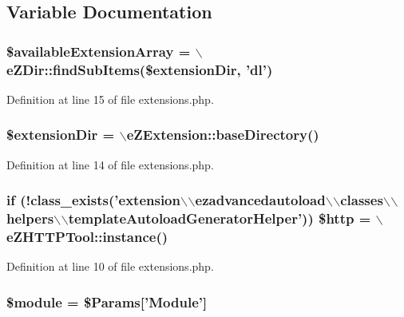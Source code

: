 \subsection{Variable Documentation}
\hypertarget{extensions_8php_a6fef3e6ef57dbe6a39892b6de0cc7f5f}{
\subsubsection[{\$available\-Extension\-Array}]{\setlength{\rightskip}{0pt plus 5cm}\$available\-Extension\-Array = $\backslash$e\-Z\-Dir\-::find\-Sub\-Items(\$extension\-Dir, 'dl')}}\label{extensions_8php_a6fef3e6ef57dbe6a39892b6de0cc7f5f}


Definition at line 15 of file extensions.\-php.

\hypertarget{extensions_8php_a511fe73f345235dca8dfab597f398521}{
\subsubsection[{\$extension\-Dir}]{\setlength{\rightskip}{0pt plus 5cm}\$extension\-Dir = $\backslash$e\-Z\-Extension\-::base\-Directory()}}\label{extensions_8php_a511fe73f345235dca8dfab597f398521}


Definition at line 14 of file extensions.\-php.

\hypertarget{extensions_8php_ae2175412b6e13dcffd550559db6a2e65}{
\subsubsection[{\$http}]{\setlength{\rightskip}{0pt plus 5cm}if (!class\-\_\-exists('extension$\backslash$$\backslash$ezadvancedautoload$\backslash$$\backslash$classes$\backslash$$\backslash$helpers$\backslash$$\backslash$template\-Autoload\-Generator\-Helper')) \$http = $\backslash$e\-Z\-H\-T\-T\-P\-Tool\-::instance()}}\label{extensions_8php_ae2175412b6e13dcffd550559db6a2e65}


Definition at line 10 of file extensions.\-php.

\hypertarget{extensions_8php_ac531301c55a8d8b6c7613597218ff482}{
\subsubsection[{\$module}]{\setlength{\rightskip}{0pt plus 5cm}\$module = \$Params\mbox{[}'Module'\mbox{]}}}\label{extensions_8php_ac531301c55a8d8b6c7613597218ff482}


